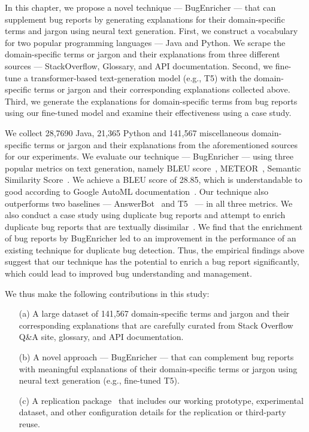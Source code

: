 In this chapter, we propose a novel technique --- BugEnricher --- that can supplement bug reports by generating explanations for their domain-specific terms and jargon using neural text generation. First,  we construct a vocabulary for two popular programming languages --- Java and Python. We scrape the domain-specific terms or jargon and their explanations from three different sources --- StackOverflow, Glossary, and API documentation. Second, we fine-tune a transformer-based text-generation model (e.g., T5) with the domain-specific terms or jargon and their corresponding explanations collected above. Third, we generate the explanations for domain-specific terms from bug reports using our fine-tuned model and examine their effectiveness using a case study.\par

We collect 28,7690 Java, 21,365 Python and 141,567 miscellaneous domain-specific terms or jargon and their explanations from the aforementioned sources for our experiments. We evaluate our technique --- BugEnricher --- using three popular metrics on text generation, namely BLEU score~\cite{papineni2002bleu}, METEOR~\cite{banerjee2005meteor}, Semantic Similarity Score~\cite{haque2022semantic}. We achieve a BLEU score of 28.85, which is understandable to good according to Google AutoML documentation~\cite{automldoc}. Our technique also outperforms two baselines --- AnswerBot~\cite{xu2017answerbot} and T5~\cite{raffel2020exploring} --- in all three metrics. We also conduct a case study using duplicate bug reports and attempt to enrich duplicate bug reports that are textually dissimilar~\cite{jahan2023towards}. We find that the enrichment of bug reports by BugEnricher led to an improvement in the performance of an existing technique for duplicate bug detection. Thus, the empirical findings above suggest that our technique has the potential to enrich a bug report significantly, which could lead to improved bug understanding and management.

We thus make the following contributions in this study:
\begin{enumerate}
    \item[(a)] A large dataset of 141,567 domain-specific terms and jargon and their corresponding explanations that are carefully curated from Stack Overflow Q\&A site, glossary, and API documentation.
    \item[(b)] A novel approach --- BugEnricher --- that can complement bug reports with meaningful explanations of their domain-specific terms or jargon using neural text generation (e.g., fine-tuned T5).
    \item[(c)] A replication package~\cite{bugenricherreplicationpackage} that includes our working prototype, experimental dataset, and other configuration details for the replication or third-party reuse.
\end{enumerate}    




